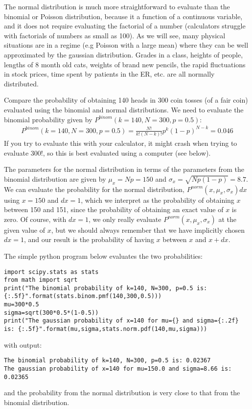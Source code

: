 The normal distribution is much more straightforward to evaluate than the binomial or Poisson distribution, because it a function of a continuous variable, and it does not require evaluating the factorial of a number (calculators struggle with factorials of numbers as small as 100). As we will see, many physical situations are in a regime (e.g Poisson with a large mean) where they can be well approximated by the gaussian distribution. Grades in a class, heights of people, lengths of 8 month old cats, weights of brand new pencils, the rapid fluctuations in stock prices, time spent by patients in the ER, etc. are all normally distributed. 
\clearpage
\begin{example}{}{Compare the probability of obtaining 140 heads in 300 coin tosses (of a fair coin) evaluated using the binomial and normal distributions.}{}
We need to evaluate the binomial probability given by $P^{binom}(k=140,N=300,p=0.5)$:
\begin{align*}
P^{binom}(k=140,N=300,p=0.5)=\frac{N!}{k!(N-k)!}p^k(1-p)^{N-k}=0.046
\end{align*}
If you try to evaluate this with your calculator, it might crash when trying to evaluate $300!$, so this is best evaluated using a computer (see below).

The parameters for the normal distribution in terms of the parameters from the binomial distribution are given by $\mu_x=Np=150$ and $\sigma_x=\sqrt{Np(1-p)}=8.7$. We can evaluate the probability for the normal distribution, $P^{norm}(x,\mu_x,\sigma_x)dx$ using $x=150$ and $dx=1$, which we interpret as the probability of obtaining $x$ between 150 and 151, since the probability of obtaining an exact value of $x$ is zero. Of course, with $dx=1$, we only really evaluate $P^{norm}(x,\mu_x,\sigma_x)$ at the given value of $x$, but we should always remember that we have implicitly chosen $dx=1$, and our result is the probability of having $x$ between $x$ and $x+dx$. 

The simple python program below evaluates the two probabilities:  
\begin{lstlisting}
import scipy.stats as stats
from math import sqrt
print("The binomial probability of k=140, N=300, p=0.5 is: {:.5f}".format(stats.binom.pmf(140,300,0.5)))
mu=300*0.5
sigma=sqrt(300*0.5*(1-0.5))
print("The gaussian probability of x=140 for mu={} and sigma={:.2f} is: {:.5f}".format(mu,sigma,stats.norm.pdf(140,mu,sigma)))
\end{lstlisting}
with output:
\begin{verbatim}
The binomial probability of k=140, N=300, p=0.5 is: 0.02367
The gaussian probability of x=140 for mu=150.0 and sigma=8.66 is: 0.02365
\end{verbatim}
and the probability from the normal distribution is very close to that from the binomial distribution.
\end{example}


